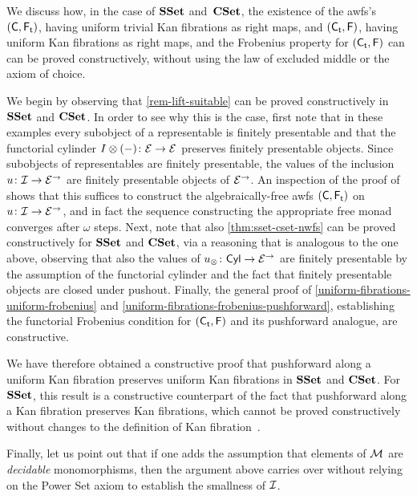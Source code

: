\documentclass[reqno,10pt,a4paper,oneside,draft]{amsart}
\begin{document}
{{\begin{remark} \label{rem:constructive-small-object}
We discuss how, in the case of $\SSet$ and~$\CSet$, the existence of the awfs's $(\CC, \TF)$, having uniform trivial Kan fibrations as right maps, and $(\TC, \FF)$, having uniform Kan fibrations as right maps, and the Frobenius property for $(\TC, \FF)$ can can be proved constructively, \ie without using the law of excluded middle or the axiom of choice.

We begin by observing that \cref{rem-lift-suitable} can be proved constructively in $\SSet$ and $\CSet$.
In order to see why this is the case, first note that in these examples every subobject of a representable is finitely presentable and that the functorial cylinder $\interval \otimes (-) \co \cal{E} \to \cal{E}$ preserves finitely presentable objects.
Since subobjects of representables are finitely presentable, the values of the inclusion $u \co \cal{I} \to \cal{E}^\to$ are finitely presentable objects of $\cal{E}^\to$.
An inspection of the proof of \cite[Theorem~4.4]{garner:small-object-argument} shows that this suffices to construct the algebraically-free awfs $(\CC, \TF)$ on $u \co \cal{I} \to \cal{E}^\to$, and in fact the sequence constructing the appropriate free monad converges after $\omega$ steps.
Next, note that also \cref{thm:sset-cset-nwfs} can be proved constructively for $\SSet$ and $\CSet$, via a reasoning that is analogous to the one above, observing that also the values of $u_\otimes \co \Cyl \to \cal{E}^\to$ are finitely presentable by the assumption of the functorial cylinder and the fact that finitely presentable objects are closed under pushout.
Finally, the general proof of \cref{uniform-fibrations-uniform-frobenius} and \cref{uniform-fibrations-frobenius-pushforward}, establishing the functorial Frobenius condition for $(\TC, \FF)$ and its pushforward analogue, are constructive.

We have therefore obtained a constructive proof that pushforward along a uniform Kan fibration preserves uniform Kan fibrations in $\SSet$ and $\CSet$.
For $\SSet$, this result is a constructive counterpart of the fact that pushforward along a Kan fibration preserves Kan fibrations, which cannot be proved constructively without changes to the definition of Kan fibration~\cite{coquand-non-constructivity-kan}.

Finally, let us point out that if one adds the assumption that elements of $\cal{M}$ are \emph{decidable} monomorphisms, then the argument above carries over without relying on the Power Set axiom to establish the smallness of $\cal{I}$.
\end{remark}

}}
\end{document}

